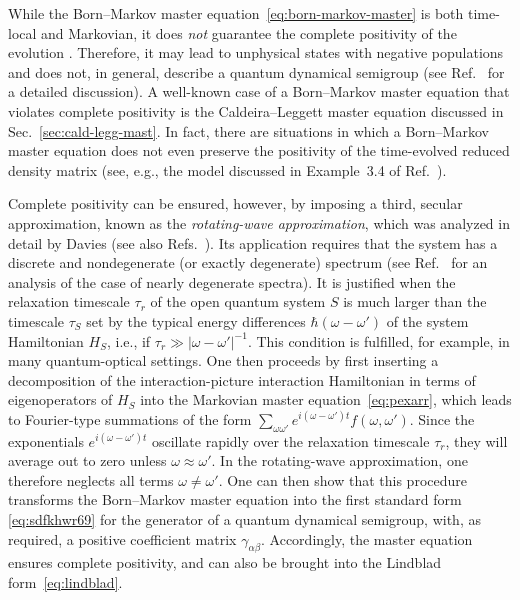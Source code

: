 \documentclass[3p,sort&compress]{elsarticle}
\providecommand{\abs}[1]{\left\lvert#1\right\rvert}
\newcommand{\E}{\ensuremath{e}}
\newcommand{\I}{\ensuremath{i}}
\newcommand{\op}[1]{#1}
\begin{document}
While the Born--Markov master equation~\eqref{eq:born-markov-master} is both time-local and Markovian, it does \emph{not} guarantee the complete positivity of the evolution \cite{Alicki:2007:uu,Benatti:2005:ii}. Therefore, it may lead to unphysical states with negative populations and does not, in general, describe a quantum dynamical semigroup (see Ref.~\cite{Benatti:2005:ii} for a detailed discussion). A well-known case of a Born--Markov master equation that violates complete positivity is the Caldeira--Leggett master equation \cite{Caldeira:1983:on} discussed in Sec.~\ref{sec:cald-legg-mast}. In fact, there are situations in which a Born--Markov master equation does not even preserve the positivity of the time-evolved reduced density matrix \cite{Dumke:1979:ia,Benatti:2005:ii} (see, e.g., the model discussed in Example~3.4 of Ref.~\cite{Benatti:2005:ii}).

Complete positivity can be ensured, however, by imposing a third, secular approximation, known as the \emph{rotating-wave approximation}, which was analyzed in detail by Davies \cite{Davies:1974:tw,Davies:1976:oo,Davies:1976:uu,Davies:1978:uu} (see also Refs.~\cite{Dumke:1979:ia,Breuer:2002:oq,Alicki:2007:uu,Hornberger:2009:aq}). Its application requires that the system has a discrete and nondegenerate (or exactly degenerate) spectrum (see Ref.~\cite{Davies:1978:uu} for an analysis of the case of nearly degenerate spectra). It is justified when the relaxation timescale $\tau_r$ of the open quantum system $S$ is much larger than the timescale $\tau_S$ set by the typical energy differences $\hbar(\omega-\omega')$ of the system Hamiltonian $\op{H}_S$, i.e., if $\tau_r \gg \abs{\omega-\omega'}^{-1}$. This condition is fulfilled, for example, in many quantum-optical settings. One then proceeds by first inserting a decomposition of the interaction-picture interaction Hamiltonian in terms of eigenoperators of $\op{H}_S$ into the Markovian master equation~\eqref{eq:pexarr}, which leads to Fourier-type summations of the form $\sum_{\omega \omega'} \E^{\I (\omega-\omega')t} f(\omega, \omega')$. Since the exponentials $\E^{\I (\omega-\omega')t}$ oscillate rapidly over the relaxation timescale $\tau_r$, they will average out to zero unless $\omega \approx \omega'$. In the rotating-wave approximation, one therefore neglects all terms $\omega \not= \omega'$.  One can then show \cite{Davies:1974:tw,Davies:1976:oo,Davies:1976:uu,Breuer:2002:oq,Alicki:2007:uu,Hornberger:2009:aq} that this procedure transforms the Born--Markov master equation into the first standard form \eqref{eq:sdfkhwr69} for the generator of a quantum dynamical semigroup, with, as required, a positive coefficient matrix $\gamma_{\alpha\beta}$. Accordingly, the master equation ensures complete positivity, and can also be brought into the Lindblad form~\eqref{eq:lindblad}.
\end{document}
